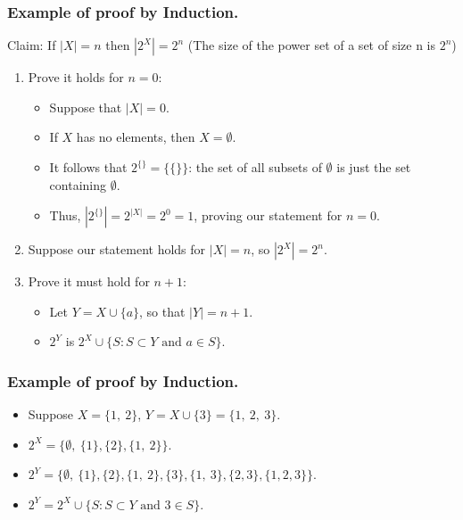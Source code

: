 \documentclass[aspectratio=169, handout]{beamer}
\numberwithin{equation}{section}
\begin{document}
\begin{frame}
\frametitle{Example of proof by Induction.}

Claim:  If $|X|=n$ then $|2^X|=2^n$ (The size of the power set of a set of size n is $2^n$)\\\pause
\begin{enumerate}
\item Prove it holds for $n=0$: \pause
\begin{itemize}
\item Suppose that $|X|=0$.  \pause
\item If $X$ has no elements, then $X=\emptyset$. \pause
\item It follows that  $2^{\{\}}=\{\{\}\}$: the set of all subsets of $\emptyset$ is just the set containing $\emptyset$.  \pause
\item Thus, $|2^{\{\}}|=2^{|X|}=2^0=1$, proving our statement for $n=0$.
\end{itemize}
\pause
\item Suppose our statement holds for $|X|=n$, so $|2^X|=2^n$.  \pause

\item Prove it must hold for $n+1$: \pause
\begin{itemize}
\item Let $Y=X\cup \{a\}$, so that $|Y|=n+1$.  \pause
\item $2^Y$ is $2^X\cup\{S: S\subset Y \text{ and } a\in S\}$.  
\end{itemize}
\end{enumerate}
\end{frame}


\begin{frame}
\frametitle{Example of proof by Induction.}
\begin{itemize}
\item Suppose $X=\{1,\ 2\}$, $Y=X\cup \{3\}=\{1,\ 2,\ 3\}$.\pause
\item $2^X=\{\emptyset,\ \{1\}, \{2\}, \{1,\ 2\}\}$.\pause
\item $2^Y=\{\emptyset,\ \{1\}, \{2\}, \{1,\ 2\}, \{3\},\{1,\ 3\}, \{2, 3\}, \{1, 2, 3\} \}$.\pause
\item $2^Y=2^X\cup \{S: S\subset Y  \text{ and } 3\in S\}$.
 
\end{itemize}

\end{frame}
\end{document}
